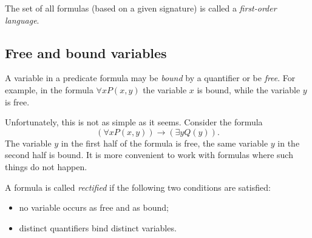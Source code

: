 \begin{page}
\setcounter{section}{1}
\setcounter{subsection}{1}
\setcounter{dfn}{4}
\label{portion:567}

\begin{dfn}
The set of all formulas (based on a given signature) is called a \emph{first-order language}.
\end{dfn}

\end{page}

\begin{page}
\setcounter{section}{1}
\setcounter{subsection}{2}
\setcounter{dfn}{4}
\label{portion:570}

\subsection{Free and bound variables}
A variable in a predicate formula may be \emph{bound} by a quantifier or be \emph{free}.
For example, in the formula $\forall x P(x,y)$ the variable $x$ is bound, while the variable $y$ is free.

Unfortunately, this is not as simple as it seems.
Consider the formula
\[
(\forall x P(x,y)) \to (\exists y Q(y)).
\]
The variable $y$ in the first half of the formula is free, the same variable $y$ in the second half is bound.
It is more convenient to work with formulas where such things do not happen.


\end{page}

\begin{page}
\setcounter{section}{1}
\setcounter{subsection}{2}
\setcounter{dfn}{5}
\label{portion:572}

\begin{dfn}
A formula is called \emph{rectified} if the following two conditions are satisfied:
\begin{itemize}
\item
no variable occurs as free and as bound;
\item
distinct quantifiers bind distinct variables.
\end{itemize}
\end{dfn}

\end{page}

